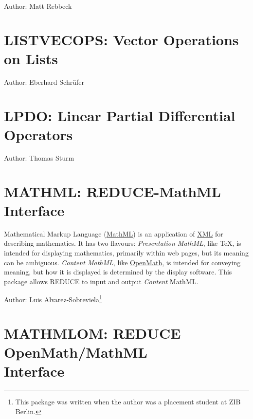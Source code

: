 Author: Matt Rebbeck



\newpage

\section{LISTVECOPS: Vector Operations on Lists}
\label{LISTVECOPS}

Author: Eberhard Schr\"{u}fer



\newpage

\section{LPDO: Linear Partial Differential Operators}
\label{LPDO}

Author: Thomas Sturm



\newpage

\section{MATHML: REDUCE-MathML Interface}

Mathematical Markup Language (\href{https://www.w3.org/Math/}{MathML})
is an application of \href{https://www.w3.org/XML/}{XML} for
describing mathematics.  It has two flavours: \emph{Presentation
MathML}, like \TeX, is intended for displaying mathematics, primarily
within web pages, but its meaning can be ambiguous.  \emph{Content
MathML}, like \href{https://openmath.org/}{OpenMath}, is intended for
conveying meaning, but how it is displayed is determined by the
display software.  This package allows REDUCE to input and output
\emph{Content} MathML.

Author: Luis Alvarez-Sobreviela\footnote{This package was written when
the author was a placement student at ZIB Berlin.}



\newpage

\section[MATHMLOM: REDUCE OpenMath/MathML Interface]{MATHMLOM: REDUCE OpenMath/MathML\\Interface}

